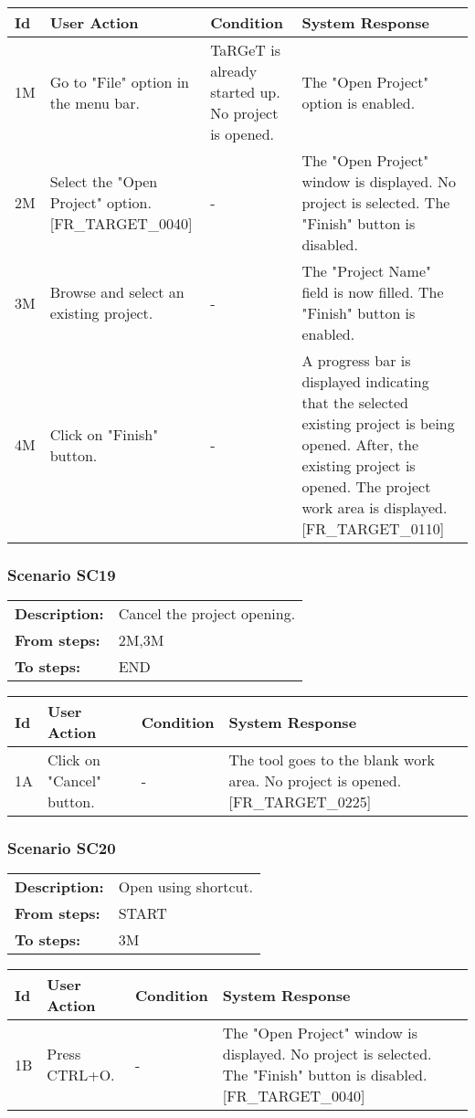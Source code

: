 \documentclass[a4paper,11pt]{article}
\newcommand{\bl}{\\ \hline}
\begin{document}
\begin{tabular}{|p{0.8in}|p{1.6in}|p{1.6in}|p{1.6in}|}
\hline
Id & User Action & Condition & System Response  \bl 
1M & Go to "File" option in the menu bar.   & TaRGeT is already started up. No project is opened.
					 & The "Open Project" option is enabled.  \bl 
2M & Select the "Open Project" option. [FR_TARGET_0040] & - & The "Open Project" window is displayed. No project is
						selected. The "Finish" button is disabled. \bl 
3M & Browse and select an existing project. & - & The "Project Name" field is now filled. The "Finish"
						button is enabled. \bl 
4M & Click on "Finish" button. & - & A progress bar is displayed indicating that the selected
						existing project is being opened. After, the existing project is
						opened. The project work area is displayed. [FR_TARGET_0110]
					 \bl 
\end{tabular}
\subsubsection*{Scenario SC19}
\begin{tabular}{p{1in}p{4in}}
{\bf Description:} & Cancel the project opening. \\
{\bf From steps:} & 2M,3M \\
{\bf To steps:} & END \\
\end{tabular}
 
\begin{tabular}{|p{0.8in}|p{1.6in}|p{1.6in}|p{1.6in}|}
\hline
Id & User Action & Condition & System Response  \bl 
1A & Click on "Cancel" button. & - & The tool goes to the blank work area. No project is
						opened. [FR_TARGET_0225] \bl 
\end{tabular}
\subsubsection*{Scenario SC20}
\begin{tabular}{p{1in}p{4in}}
{\bf Description:} & Open using shortcut. \\
{\bf From steps:} & START \\
{\bf To steps:} & 3M \\
\end{tabular}
 
\begin{tabular}{|p{0.8in}|p{1.6in}|p{1.6in}|p{1.6in}|}
\hline
Id & User Action & Condition & System Response  \bl 
1B & Press CTRL+O. & - & The "Open Project" window is displayed. No project is
						selected. The "Finish" button is disabled. [FR_TARGET_0040]
					 \bl 
\end{tabular}
\end{document}
